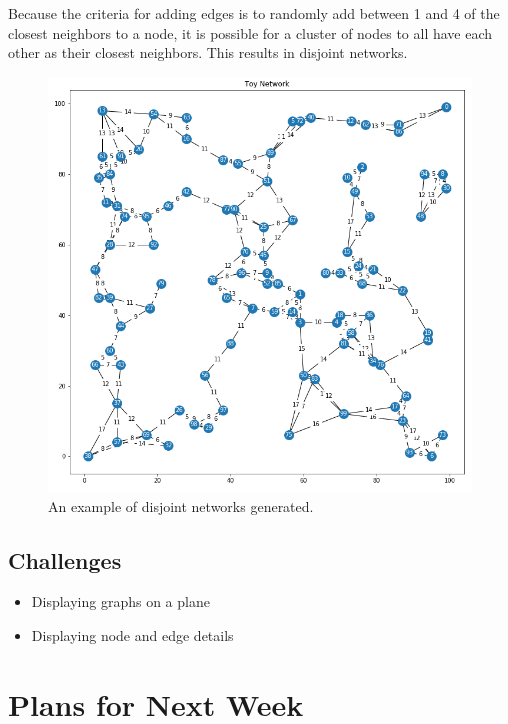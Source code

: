 \documentclass{weeklyreport}
\begin{document}
Because the criteria for adding edges is to randomly add between 1 and 4 of the closest neighbors to a node, it is possible for a cluster of nodes to all have each other as their closest neighbors. This results in disjoint networks.

\begin{figure}[h!]
    \centering
    \includegraphics[width = \textwidth, trim = 85 90 85 85, clip]{week_1/Network_416b9f8671a64f04a87bbb59c431dc28.png}
    \caption{An example of disjoint networks generated.}
    \label{fig:Disjoint Networks}
\end{figure}

\subsection*{Challenges}

\begin{itemize}
    \item Displaying graphs on a plane
    \item Displaying node and edge details
\end{itemize}

\section*{Plans for Next Week}
\end{document}
